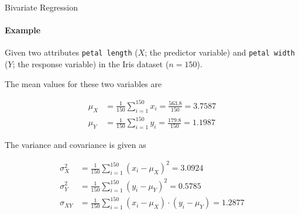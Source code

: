 %
%
%
\begin{frame}{Bivariate Regression}
\framesubtitle{Example}
    Given two attributes {\tt petal length} ($X$; the predictor variable) and 
    {\tt petal width} ($Y$; the response variable) in the
    Iris dataset ($n=150$). %

    The mean values for these two variables are
\begin{small}
    \begin{align*}
        \mu_X & = \frac{1}{150} \sum_{i=1}^{150} x_i = \frac{563.8}{150} =
        3.7587\\
        \mu_Y & = \frac{1}{150} \sum_{i=1}^{150} y_i = \frac{179.8}{150} =
        1.1987
    \end{align*}
\end{small}
    The variance and covariance is given as
\begin{small}
    \begin{align*}
        \sigma_X^2 & = \frac{1}{150} \sum_{i=1}^{150} (x_i - \mu_X)^2  =
        3.0924\\
        \sigma_Y^2 & = \frac{1}{150} \sum_{i=1}^{150} (y_i - \mu_Y)^2  =
        0.5785\\
        \sigma_{XY} & = \frac{1}{150} \sum_{i=1}^{150} (x_i -
        \mu_X)\cdot (y_i - \mu_Y)  = 1.2877
    \end{align*}
\end{small}
\end{frame}

